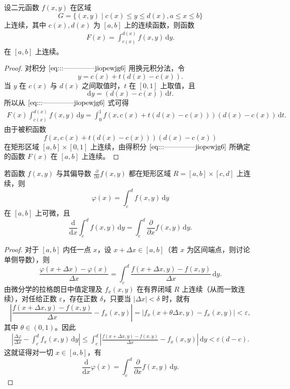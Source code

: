 \documentclass[../../main.tex]{subfiles}
\begin{document}
\begin{theorem}[连续性]\label{theorem:含参量积分的连续性1}
设二元函数 \( f(x,y) \) 在区域
\[
G = \{ (x,y) \mid c(x) \leqslant y \leqslant d(x), a \leqslant x \leqslant b \}
\]
上连续，其中 \( c(x), d(x) \) 为 \( [a,b] \) 上的连续函数，则函数
\begin{align}
F(x) = \int_{c(x)}^{d(x)} f(x,y) \, \mathrm{d}y. \label{eq:::--------------jiopewjg6}
\end{align}
在 \( [a,b] \) 上连续。
\end{theorem}
\begin{proof}
对积分 \(\eqref{eq:::--------------jiopewjg6}\) 用换元积分法，令
\[
y = c(x) + t(d(x) - c(x)).
\]
当 \( y \) 在 \( c(x) \) 与 \( d(x) \) 之间取值时，\( t \) 在 \( [0,1] \) 上取值，且
\[
\mathrm{d}y = (d(x) - c(x)) \, \mathrm{d}t.
\]
所以从 \(\eqref{eq:::--------------jiopewjg6}\) 式可得
\begin{align*}
F(x)  \int_{c(x)}^{d(x)} f(x,y) \, \mathrm{d}y
= \int_{0}^{1} f(x,c(x) + t(d(x) - c(x))) (d(x) - c(x)) \, \mathrm{d}t.
\end{align*}
由于被积函数
\[
f(x,c(x) + t(d(x) - c(x))) (d(x) - c(x))
\]
在矩形区域 \( [a,b] \times [0,1] \) 上连续，由得积分 \(\eqref{eq:::--------------jiopewjg6}\) 所确定的函数 \( F(x) \) 在 \( [a,b] \) 上连续。

\end{proof}

\begin{theorem}[可微性]\label{theorem:含参量积分的可微性1}
若函数 \( f(x,y) \) 与其偏导数 \( \frac{\partial}{\partial x}f(x,y) \) 都在矩形区域 \( R = [a,b] \times [c,d] \) 上连续，则
\[
\varphi(x) = \int_{c}^{d} f(x,y) \, \mathrm{d}y
\]
在 \( [a,b] \) 上可微，且
\[
\frac{\mathrm{d}}{\mathrm{d}x} \int_{c}^{d} f(x,y) \, \mathrm{d}y = \int_{c}^{d} \frac{\partial}{\partial x} f(x,y) \, \mathrm{d}y.
\]
\end{theorem}
\begin{proof}
对于 \( [a,b] \) 内任一点 \( x \)，设 \( x + \Delta x \in [a,b] \)（若 \( x \) 为区间端点，则讨论单侧导数），则
\[
\frac{\varphi(x + \Delta x) - \varphi(x)}{\Delta x} = \int_{c}^{d} \frac{f(x + \Delta x,y) - f(x,y)}{\Delta x} \, \mathrm{d}y.
\]
由微分学的拉格朗日中值定理及 \( f_x(x,y) \) 在有界闭域 \( R \) 上连续（从而一致连续），对任给正数 \( \varepsilon \)，存在正数 \( \delta \)，只要当 \( |\Delta x| < \delta \) 时，就有
\[
\left| \frac{f(x + \Delta x,y) - f(x,y)}{\Delta x} - f_x(x,y) \right|
= |f_x(x + \theta \Delta x,y) - f_x(x,y)| < \varepsilon,
\]
其中 \( \theta \in (0,1) \)。因此
\begin{align*}
\left| \frac{\Delta \varphi}{\Delta x} - \int_{c}^{d} f_x(x,y) \, \mathrm{d}y \right|
\leqslant \int_{c}^{d} \left| \frac{f(x + \Delta x,y) - f(x,y)}{\Delta x} - f_x(x,y) \right| \, \mathrm{d}y
< \varepsilon(d - c).
\end{align*}
这就证得对一切 \( x \in [a,b] \)，有
\[
\frac{\mathrm{d}}{\mathrm{d}x} \varphi(x) = \int_{c}^{d} \frac{\partial}{\partial x} f(x,y) \, \mathrm{d}y.
\]

\end{proof}
\end{document}
